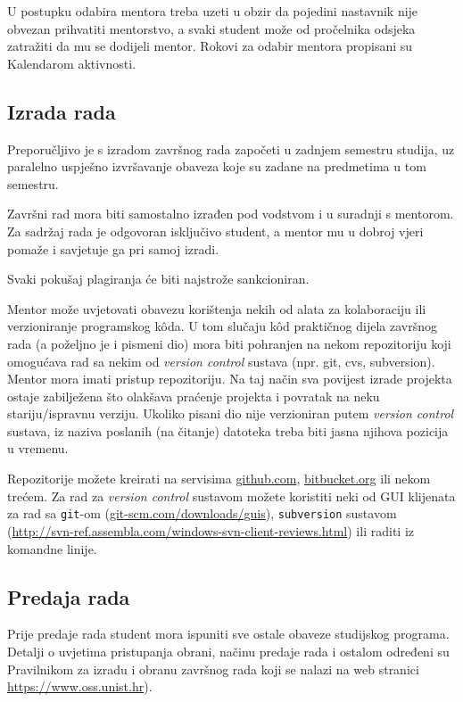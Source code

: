 U postupku odabira mentora treba uzeti u obzir da pojedini nastavnik nije obvezan prihvatiti mentorstvo, a svaki student može od pročelnika odsjeka zatražiti da mu se dodijeli mentor. Rokovi za odabir mentora propisani su Kalendarom aktivnosti.

\subsection{Izrada rada}
Preporučljivo je s izradom završnog rada započeti u zadnjem semestru studija, uz paralelno uspješno izvršavanje obaveza koje su zadane na predmetima u tom semestru.

Završni rad mora biti samostalno izrađen pod vodstvom i u suradnji s mentorom. Za sadržaj rada je odgovoran isključivo student, a mentor mu u dobroj vjeri pomaže i savjetuje ga pri samoj izradi.

Svaki pokušaj plagiranja će biti najstrože sankcioniran.

Mentor može uvjetovati obavezu korištenja nekih od alata za kolaboraciju ili verzioniranje programskog k\^oda. U tom slučaju k\^od praktičnog dijela završnog rada (a poželjno je i pismeni dio) mora biti pohranjen na nekom repozitoriju koji omogućava rad sa nekim od \textit{version control} sustava (npr. git, cvs, subversion). Mentor mora imati pristup repozitoriju. Na taj način sva povijest izrade projekta ostaje zabilježena što olakšava praćenje projekta i povratak na neku stariju/ispravnu verziju. Ukoliko pisani dio nije verzioniran putem \textit{version control} sustava, iz naziva poslanih (na čitanje) datoteka treba biti jasna njihova pozicija u vremenu.  
 
Repozitorije možete kreirati na servisima \url{github.com}, \url{bitbucket.org} ili nekom trećem. Za rad za \textit{version control} sustavom možete koristiti neki od GUI klijenata za rad sa 
 \texttt{git}-om (\url{git-scm.com/downloads/guis}), \texttt{subversion} sustavom (\url{http://svn-ref.assembla.com/windows-svn-client-reviews.html}) ili raditi iz komandne linije.
 
\subsection{Predaja rada}
Prije predaje rada student mora ispuniti sve ostale obaveze studijskog programa. Detalji o uvjetima pristupanja obrani, načinu predaje rada i ostalom određeni su Pravilnikom za izradu i obranu završnog rada koji se nalazi na web stranici \url{https://www.oss.unist.hr}).

